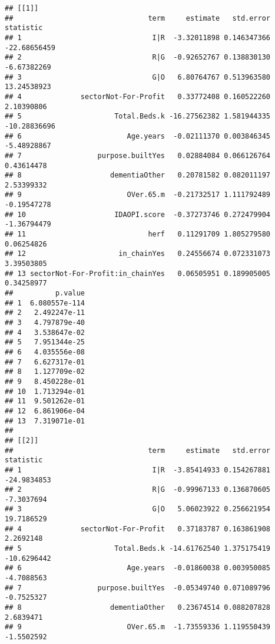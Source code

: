 \documentclass[]{article}
\newenvironment{Shaded}{\begin{snugshade}}{\end{snugshade}}
\newcommand{\KeywordTok}[1]{\textcolor[rgb]{0.13,0.29,0.53}{\textbf{{#1}}}}
\newcommand{\DataTypeTok}[1]{\textcolor[rgb]{0.13,0.29,0.53}{{#1}}}
\newcommand{\StringTok}[1]{\textcolor[rgb]{0.31,0.60,0.02}{{#1}}}
\newcommand{\NormalTok}[1]{{#1}}
\begin{document}
\begin{Shaded}
\end{Shaded}

\begin{verbatim}
## [[1]]
##                                term     estimate   std.error    statistic
## 1                               I|R  -3.32011898 0.146347366 -22.68656459
## 2                               R|G  -0.92652767 0.138830130  -6.67382269
## 3                               G|O   6.80764767 0.513963580  13.24538923
## 4              sectorNot-For-Profit   0.33772408 0.160522260   2.10390806
## 5                      Total.Beds.k -16.27562382 1.581944335 -10.28836696
## 6                         Age.years  -0.02111370 0.003846345  -5.48928867
## 7                  purpose.builtYes   0.02884084 0.066126764   0.43614478
## 8                     dementiaOther   0.20781582 0.082011197   2.53399332
## 9                         OVer.65.m  -0.21732517 1.111792489  -0.19547278
## 10                     IDAOPI.score  -0.37273746 0.272479904  -1.36794479
## 11                             herf   0.11291709 1.805279580   0.06254826
## 12                      in_chainYes   0.24556674 0.072331073   3.39503805
## 13 sectorNot-For-Profit:in_chainYes   0.06505951 0.189905005   0.34258977
##          p.value
## 1  6.080557e-114
## 2   2.492247e-11
## 3   4.797879e-40
## 4   3.538647e-02
## 5   7.951344e-25
## 6   4.035556e-08
## 7   6.627317e-01
## 8   1.127709e-02
## 9   8.450228e-01
## 10  1.713294e-01
## 11  9.501262e-01
## 12  6.861906e-04
## 13  7.319071e-01
## 
## [[2]]
##                                term     estimate   std.error   statistic
## 1                               I|R  -3.85414933 0.154267881 -24.9834853
## 2                               R|G  -0.99967133 0.136870605  -7.3037694
## 3                               G|O   5.06023922 0.256621954  19.7186529
## 4              sectorNot-For-Profit   0.37183787 0.163861908   2.2692148
## 5                      Total.Beds.k -14.61762540 1.375175419 -10.6296442
## 6                         Age.years  -0.01860038 0.003950085  -4.7088563
## 7                  purpose.builtYes  -0.05349740 0.071089796  -0.7525327
## 8                     dementiaOther   0.23674514 0.088207828   2.6839471
## 9                         OVer.65.m  -1.73559336 1.119550439  -1.5502592

\end{verbatim}
\end{document}
